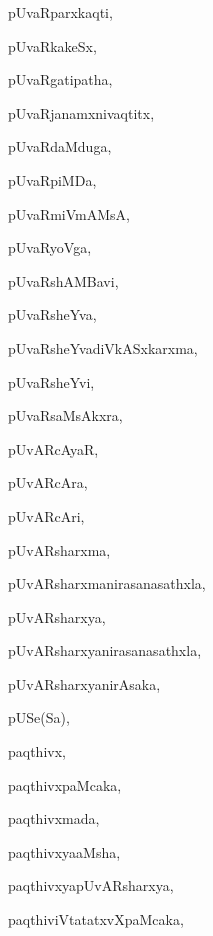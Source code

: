\begin{multicols}{3}
{\noindent
{pUvaRparxkaqti}, \pageref{pUvaRparxkaqti}

\noindent
{pUvaRkakeSx}, \pageref{pUvaRkakeSx}

\noindent
{pUvaRgatipatha}, \pageref{pUvaRgatipatha}

\noindent
{pUvaRjanamxnivaqtitx}, \pageref{pUvaRjanamxnivaqtitx}

\noindent
{pUvaRdaMduga}, \pageref{pUvaRdaMduga}

\noindent
{pUvaRpiMDa}, \pageref{pUvaRpiMDa}

\noindent
{pUvaRmiVmAMsA}, \pageref{pUvaRmiVmAMsA}

\noindent
{pUvaRyoVga}, \pageref{pUvaRyoVga}

\noindent
{pUvaRshAMBavi}, \pageref{pUvaRshAMBavi}

\noindent
{pUvaRsheYva}, \pageref{pUvaRsheYva}

\noindent
{pUvaRsheYvadiVkASxkarxma}, \pageref{pUvaRsheYvadiVkASxkarxma}

\noindent
{pUvaRsheYvi}, \pageref{pUvaRsheYvi}

\noindent
{pUvaRsaMsAkxra}, \pageref{pUvaRsaMsAkxra}

\noindent
{pUvARcAyaR}, \pageref{pUvARcAyaR}

\noindent
{pUvARcAra}, \pageref{pUvARcAra}

\noindent
{pUvARcAri}, \pageref{pUvARcAri}

\noindent
{pUvARsharxma}, \pageref{pUvARsharxma}

\noindent
{pUvARsharxmanirasanasathxla}, \pageref{pUvARsharxmanirasanasathxla}

\noindent
{pUvARsharxya}, \pageref{pUvARsharxya}

\noindent
{pUvARsharxyanirasanasathxla}, \pageref{pUvARsharxyanirasanasathxla}

\noindent
{pUvARsharxyanirAsaka}, \pageref{pUvARsharxyanirAsaka}

\noindent
{pUSe(Sa)}, \pageref{pUSeSa}

\noindent
{paqthivx}, \pageref{paqthivx}

\noindent
{paqthivxpaMcaka}, \pageref{paqthivxpaMcaka}

\noindent
{paqthivxmada}, \pageref{paqthivxmada}

\noindent
{paqthivxyaaMsha}, \pageref{paqthivxyaaMsha}

\noindent
{paqthivxyapUvARsharxya}, \pageref{paqthivxyapUvARsharxya}

\noindent
{paqthiviVtatatxvXpaMcaka}, \pageref{paqthiviVtatatxvXpaMcaka}

}
\end{multicols}
